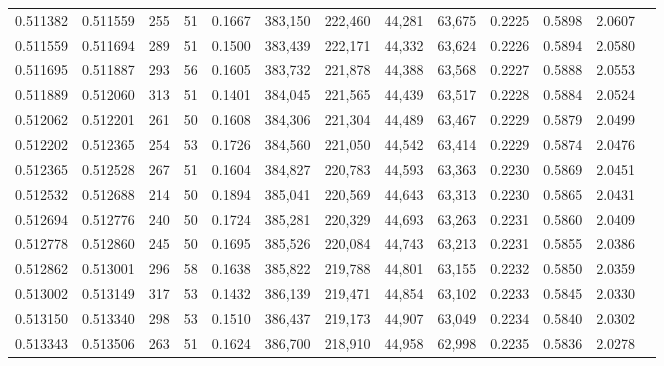 \begin{tabular}{rrrrrrrrrrrrr}
0.511382 & 0.511559 &   255 &  51 &                                     0.1667 & 383,150 & 222,460 &  44,281 &  63,675 & 0.2225 & 0.5898 & 2.0607 \\
0.511559 & 0.511694 &   289 &  51 &                                     0.1500 & 383,439 & 222,171 &  44,332 &  63,624 & 0.2226 & 0.5894 & 2.0580 \\
0.511695 & 0.511887 &   293 &  56 &                                     0.1605 & 383,732 & 221,878 &  44,388 &  63,568 & 0.2227 & 0.5888 & 2.0553 \\
0.511889 & 0.512060 &   313 &  51 &                                     0.1401 & 384,045 & 221,565 &  44,439 &  63,517 & 0.2228 & 0.5884 & 2.0524 \\
0.512062 & 0.512201 &   261 &  50 &                                     0.1608 & 384,306 & 221,304 &  44,489 &  63,467 & 0.2229 & 0.5879 & 2.0499 \\
0.512202 & 0.512365 &   254 &  53 &                                     0.1726 & 384,560 & 221,050 &  44,542 &  63,414 & 0.2229 & 0.5874 & 2.0476 \\
0.512365 & 0.512528 &   267 &  51 &                                     0.1604 & 384,827 & 220,783 &  44,593 &  63,363 & 0.2230 & 0.5869 & 2.0451 \\
0.512532 & 0.512688 &   214 &  50 &                                     0.1894 & 385,041 & 220,569 &  44,643 &  63,313 & 0.2230 & 0.5865 & 2.0431 \\
0.512694 & 0.512776 &   240 &  50 &                                     0.1724 & 385,281 & 220,329 &  44,693 &  63,263 & 0.2231 & 0.5860 & 2.0409 \\
0.512778 & 0.512860 &   245 &  50 &                                     0.1695 & 385,526 & 220,084 &  44,743 &  63,213 & 0.2231 & 0.5855 & 2.0386 \\
0.512862 & 0.513001 &   296 &  58 &                                     0.1638 & 385,822 & 219,788 &  44,801 &  63,155 & 0.2232 & 0.5850 & 2.0359 \\
0.513002 & 0.513149 &   317 &  53 &                                     0.1432 & 386,139 & 219,471 &  44,854 &  63,102 & 0.2233 & 0.5845 & 2.0330 \\
0.513150 & 0.513340 &   298 &  53 &                                     0.1510 & 386,437 & 219,173 &  44,907 &  63,049 & 0.2234 & 0.5840 & 2.0302 \\
0.513343 & 0.513506 &   263 &  51 &                                     0.1624 & 386,700 & 218,910 &  44,958 &  62,998 & 0.2235 & 0.5836 & 2.0278 \\

\end{tabular}
